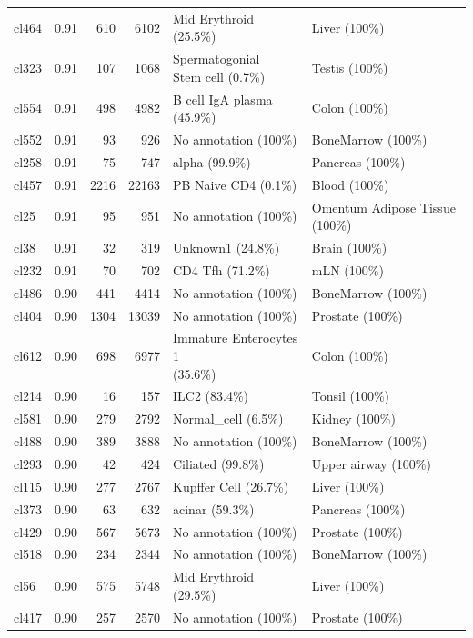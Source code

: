 \begin{table}[ht!]
\begin{tabular}{lrrrll}
  cl464 & 0.91 & 610 & 6102 & Mid Erythroid (25.5\%) & Liver (100\%) \\ 
  cl323 & 0.91 & 107 & 1068 & \specialcell[t]{Spermatogonial\\Stem cell (0.7\%)} & Testis (100\%) \\ 
  cl554 & 0.91 & 498 & 4982 & B cell IgA plasma (45.9\%) & Colon (100\%) \\ 
  cl552 & 0.91 &  93 & 926 & No annotation (100\%) & BoneMarrow (100\%) \\ 
  cl258 & 0.91 &  75 & 747 & alpha (99.9\%) & Pancreas (100\%) \\ 
  cl457 & 0.91 & 2216 & 22163 & PB Naive CD4  (0.1\%) & Blood (100\%) \\ 
  cl25 & 0.91 &  95 & 951 & No annotation (100\%) & Omentum Adipose Tissue (100\%) \\ 
  cl38 & 0.91 &  32 & 319 & Unknown1 (24.8\%) & Brain (100\%) \\ 
  cl232 & 0.91 &  70 & 702 & CD4 Tfh (71.2\%) & mLN (100\%) \\ 
  cl486 & 0.90 & 441 & 4414 & No annotation (100\%) & BoneMarrow (100\%) \\ 
  cl404 & 0.90 & 1304 & 13039 & No annotation (100\%) & Prostate (100\%) \\ 
  cl612 & 0.90 & 698 & 6977 & \specialcell[t]{Immature Enterocytes 1\\(35.6\%)} & Colon (100\%) \\ 
  cl214 & 0.90 &  16 & 157 & ILC2 (83.4\%) & Tonsil (100\%) \\ 
  cl581 & 0.90 & 279 & 2792 & Normal\_cell (6.5\%) & Kidney (100\%) \\ 
  cl488 & 0.90 & 389 & 3888 & No annotation (100\%) & BoneMarrow (100\%) \\ 
  cl293 & 0.90 &  42 & 424 & Ciliated (99.8\%) & Upper airway (100\%) \\ 
  cl115 & 0.90 & 277 & 2767 & Kupffer Cell (26.7\%) & Liver (100\%) \\ 
  cl373 & 0.90 &  63 & 632 & acinar (59.3\%) & Pancreas (100\%) \\ 
  cl429 & 0.90 & 567 & 5673 & No annotation (100\%) & Prostate (100\%) \\ 
  cl518 & 0.90 & 234 & 2344 & No annotation (100\%) & BoneMarrow (100\%) \\ 
  cl56 & 0.90 & 575 & 5748 & Mid Erythroid (29.5\%) & Liver (100\%) \\ 
  cl417 & 0.90 & 257 & 2570 & No annotation (100\%) & Prostate (100\%) \\ 

\end{tabular}
\end{table}
